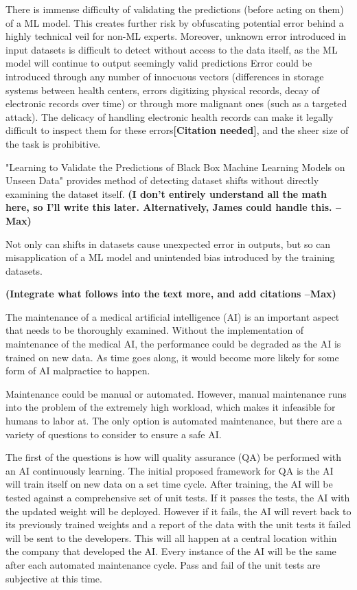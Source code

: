\documentclass[]{article}
\begin{document}
		There is immense difficulty of validating the predictions (before acting on them) of a ML model. This creates further risk by obfuscating potential error behind a highly technical veil for non-ML experts. Moreover, unknown error introduced in input datasets is difficult to detect without access to the data itself, as the ML model will continue to output seemingly valid predictions\cite{10.1145/3328519.3329126} Error could be introduced through any number of innocuous vectors (differences in storage systems between health centers, errors digitizing physical records, decay of electronic records over time) or through more malignant ones (such as a targeted attack). The delicacy of handling electronic health records can make it legally difficult to inspect them for these errors\textbf{[Citation needed]}, and the sheer size of the task is prohibitive.

		"Learning to Validate the Predictions of Black Box Machine Learning Models on Unseen Data"\cite{10.1145/3328519.3329126} provides method of detecting dataset shifts without directly examining the dataset itself. \textbf{(I don't entirely understand all the math here, so I'll write this later. Alternatively, James could handle this. --Max)}

		Not only can shifts in datasets cause unexpected error in outputs, but so can misapplication of a ML model and unintended bias introduced by the training datasets.

		\textbf{(Integrate what follows into the text more, and add citations --Max)}

		The maintenance of a medical artificial intelligence (AI) is an important aspect that needs to be thoroughly examined. Without the implementation of maintenance of the medical AI, the performance could be degraded as the AI is trained on new data. As time goes along, it would become more likely for some form of AI malpractice to happen.
	
		Maintenance could be manual or automated. However, manual maintenance runs into the problem of the extremely high workload, which makes it infeasible for humans to labor at. The only option is automated maintenance, but there are a variety of questions to consider to ensure a safe AI.
	
		The first of the questions is how will quality assurance (QA) be performed with an AI continuously learning. The initial proposed framework for QA is the AI will train itself on new data on a set time cycle. After training, the AI will be tested against a comprehensive set of unit tests. If it passes the tests, the AI with the updated weight will be deployed. However if it fails, the AI will revert back to its previously trained weights and a report of the data with the unit tests it failed will be sent to the developers. This will all happen at a central location within the company that developed the AI. Every instance of the AI will be the same after each automated maintenance cycle. Pass and fail of the unit tests are subjective at this time.
\end{document}
